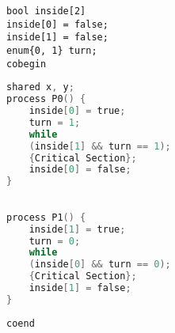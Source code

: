 \documentclass{article}
\begin{document}
\begin{verbatim}
bool inside[2]    
inside[0] = false;
inside[1] = false;
enum{0, 1} turn;  
cobegin
\end{verbatim}

\begin{minipage}{0.45\textwidth}
\begin{lstlisting}[language=C, basicstyle=\fontfamily{pcr}\selectfont\small, frame=single]
shared x, y;
process P0() {
    inside[0] = true;
    turn = 1;
    while 
    (inside[1] && turn == 1);
    {Critical Section};
    inside[0] = false;
}
\end{lstlisting}
\end{minipage}
\hfill
\begin{minipage}{0.45\textwidth}
\begin{lstlisting}[language=C, basicstyle=\fontfamily{pcr}\selectfont\small, frame=single]

process P1() {
    inside[1] = true;
    turn = 0;
    while 
    (inside[0] && turn == 0);
    {Critical Section};
    inside[1] = false;
}
\end{lstlisting}
\end{minipage}

\begin{verbatim}
coend
\end{verbatim}
\end{document}
